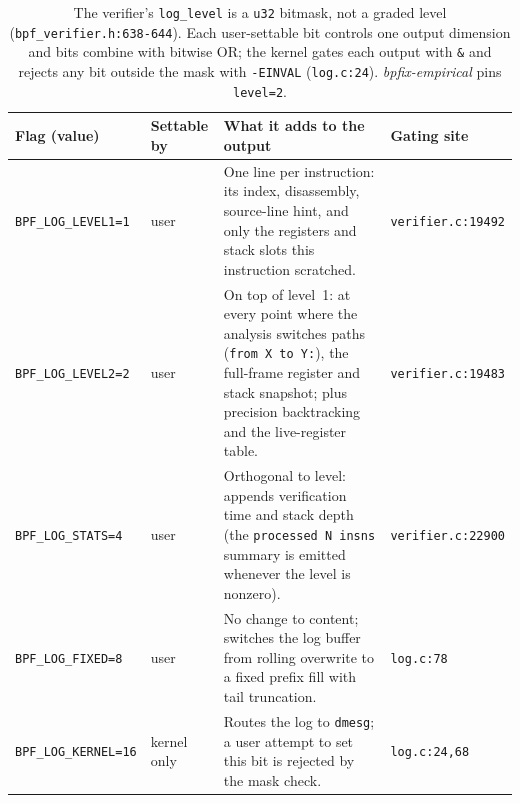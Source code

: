 \begin{table}[t]
  \centering
  \caption{The verifier's \texttt{log\_level} is a \texttt{u32} bitmask, not a graded level (\texttt{bpf\_verifier.h:638-644}). Each user-settable bit controls one output dimension and bits combine with bitwise OR; the kernel gates each output with \texttt{\&} and rejects any bit outside the mask with \texttt{-EINVAL} (\texttt{log.c:24}). \emph{bpfix-empirical} pins \texttt{level=2}.}
  \label{tab:log-levels}
  \small
  \begin{tabular}{@{}l l p{9.2cm} l@{}}
    \toprule
    Flag (value) & Settable by & What it adds to the output & Gating site \\
    \midrule
    \texttt{BPF\_LOG\_LEVEL1=1} & user & One line per instruction: its index, disassembly, source-line hint, and only the registers and stack slots this instruction scratched. & \texttt{verifier.c:19492} \\
    \texttt{BPF\_LOG\_LEVEL2=2} & user & On top of level~1: at every point where the analysis switches paths (\texttt{from X to Y:}), the full-frame register and stack snapshot; plus precision backtracking and the live-register table. & \texttt{verifier.c:19483} \\
    \texttt{BPF\_LOG\_STATS=4} & user & Orthogonal to level: appends verification time and stack depth (the \texttt{processed N insns} summary is emitted whenever the level is nonzero). & \texttt{verifier.c:22900} \\
    \texttt{BPF\_LOG\_FIXED=8} & user & No change to content; switches the log buffer from rolling overwrite to a fixed prefix fill with tail truncation. & \texttt{log.c:78} \\
    \texttt{BPF\_LOG\_KERNEL=16} & kernel only & Routes the log to \texttt{dmesg}; a user attempt to set this bit is rejected by the mask check. & \texttt{log.c:24,68} \\
    \bottomrule
  \end{tabular}
\end{table}
